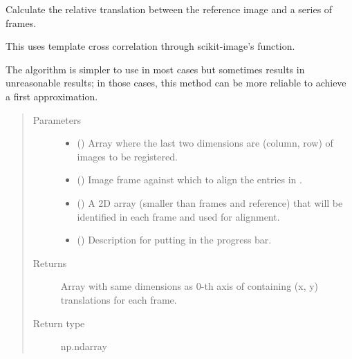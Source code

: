 \documentclass[letterpaper,10pt,english]{sphinxmanual}
\begin{document}

\begin{fulllineitems}
\label{\detokenize{xanespy:xanespy.xanes_math.register_template}}
Calculate the relative translation between the reference image and
a series of frames.

This uses template cross correlation through scikit-image’s
 function.

The  algorithm is simpler to use in most
cases but sometimes results in unreasonable results; in those
cases, this method can be more reliable to achieve a first
approximation.
\begin{quote}\begin{description}
\item[{Parameters}] \leavevmode\begin{itemize}
\item {} 
 () \textendash{} Array where the last two dimensions are (column, row) of images
to be registered.

\item {} 
 () \textendash{} Image frame against which to align the entries in .

\item {} 
 () \textendash{} A 2D array (smaller than frames and reference) that will be
identified in each frame and used for alignment.

\item {} 
 (\sphinxstyleliteralemphasis{, }) \textendash{} Description for putting in the progress bar.

\end{itemize}

\item[{Returns}] \leavevmode
{} \textendash{} Array with same dimensions as 0-th axis of  containing
(x, y) translations for each frame.

\item[{Return type}] \leavevmode
np.ndarray

\end{description}\end{quote}

\end{fulllineitems}
\end{document}
